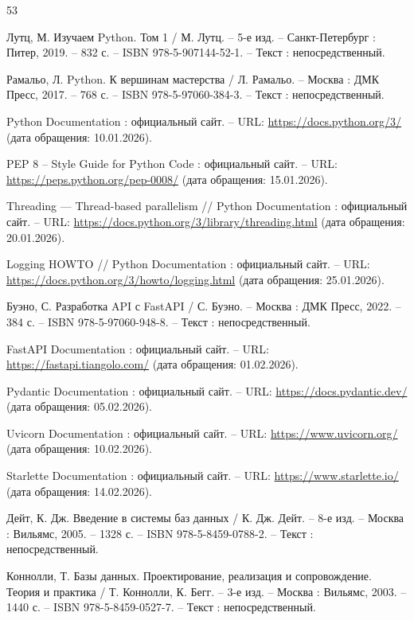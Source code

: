 
\begin{thebibliography}{53}
	
	Лутц, М. Изучаем Python. Том 1 / М. Лутц. – 5-е изд. – Санкт-Петербург : Питер, 2019. – 832 с. – ISBN 978-5-907144-52-1. – Текст : непосредственный.
	
	Рамальо, Л. Python. К вершинам мастерства / Л. Рамальо. – Москва : ДМК Пресс, 2017. – 768 с. – ISBN 978-5-97060-384-3. – Текст : непосредственный.
	
	Python Documentation : официальный сайт. – URL: \url{https://docs.python.org/3/} (дата обращения: 10.01.2026).
	
	PEP 8 – Style Guide for Python Code : официальный сайт. – URL: \url{https://peps.python.org/pep-0008/} (дата обращения: 15.01.2026).
	
	Threading --- Thread-based parallelism // Python Documentation : официальный сайт. – URL: \url{https://docs.python.org/3/library/threading.html} (дата обращения: 20.01.2026).
	
	Logging HOWTO // Python Documentation : официальный сайт. – URL: \url{https://docs.python.org/3/howto/logging.html} (дата обращения: 25.01.2026).
	
	Буэно, С. Разработка API с FastAPI / С. Буэно. – Москва : ДМК Пресс, 2022. – 384 с. – ISBN 978-5-97060-948-8. – Текст : непосредственный.
	
	FastAPI Documentation : официальный сайт. – URL: \url{https://fastapi.tiangolo.com/} (дата обращения: 01.02.2026).
	
	Pydantic Documentation : официальный сайт. – URL: \url{https://docs.pydantic.dev/} (дата обращения: 05.02.2026).
	
	Uvicorn Documentation : официальный сайт. – URL: \url{https://www.uvicorn.org/} (дата обращения: 10.02.2026).
	
	Starlette Documentation : официальный сайт. – URL: \url{https://www.starlette.io/} (дата обращения: 14.02.2026).
	
	Дейт, К. Дж. Введение в системы баз данных / К. Дж. Дейт. – 8-е изд. – Москва : Вильямс, 2005. – 1328 с. – ISBN 978-5-8459-0788-2. – Текст : непосредственный.
	
	Коннолли, Т. Базы данных. Проектирование, реализация и сопровождение. Теория и практика / Т. Коннолли, К. Бегг. – 3-е изд. – Москва : Вильямс, 2003. – 1440 с. – ISBN 978-5-8459-0527-7. – Текст : непосредственный.
	

\end{thebibliography}
